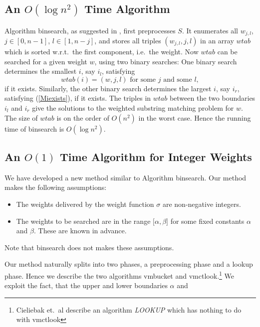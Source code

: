 \documentclass[12pt]{article}
\newcommand{\Binsearch}[0]{{\small \textsf{binsearch}}\xspace}
\newcommand{\Vmbucket}[0]{{\small \textsf{vmbucket}}\xspace}
\newcommand{\Vmctlook}[0]{{\small \textsf{vmctlook}}\xspace}
\newcommand{\Weight}[0]{w}
\newcommand{\WSMP}{weighted substring matching problem\xspace}
\begin{document}
\subsection{An $O(\log n^{2})$ Time Algorithm}
Algorithm \Binsearch, as suggested in \cite{CIE:ERL:LIP:STO:WEL:2001},
first preprocesses \(S\). It enumerates all \(\Weight_{j,l}\),
\(j\in[0,n-1]\), \(l\in[1,n-j]\), and stores all triples 
\((\Weight_{j,l},j,l)\) in an array \(wtab\) which is sorted w.r.t.\ the first 
component, i.e.\ the weight. Now \(wtab\) can be searched for a given weight
\(\Weight\), using two binary searches: One binary search
determines the smallest \(i\), say \(i_{l}\), satisfying
\begin{equation}
wtab(i)=(\Weight,j,l)\mbox{ for some }j\mbox{ and some }l,\label{Miexists}
\end{equation}
if it exists. Similarly, the other binary search determines the 
largest \(i\), say \(i_{r}\), satisfying (\ref{Miexists}), if it exists.
The triples in \(wtab\) between the two boundaries \(i_{l}\) and \(i_{r}\)
give the solutions to the \WSMP for \(\Weight\). The size of \(wtab\) is
on the order of \(O(n^{2})\) in the worst case. Hence the running time
of \Binsearch is \(O(\log n^{2})\).

\subsection{An $O(1)$ Time Algorithm for Integer Weights}\label{OptimalAlgorithm}
We have developed a new method similar to Algorithm \Binsearch.
Our method makes the following assumptions:
\begin{itemize}
\item
The weights delivered by the weight function \(\sigma\) are non-negative 
integers.
\item
The weights to be searched are in the range \(\lbrack\alpha,\beta\rbrack\)
for some fixed constants \(\alpha\) and \(\beta\). These are known in advance.
\end{itemize}
Note that \Binsearch does not makes these assumptions.

Our method naturally splits into two phases, a preprocessing phase and a 
lookup phase. Hence we describe the two algorithms
\Vmbucket and \Vmctlook.\footnote{Cieliebak et.\ al 
\cite{CIE:ERL:LIP:STO:WEL:2001} describe
an algorithm \emph{LOOKUP} which has nothing to do with \Vmctlook}
We exploit the fact, that the upper and lower boundaries \(\alpha\) and 
\end{document}

